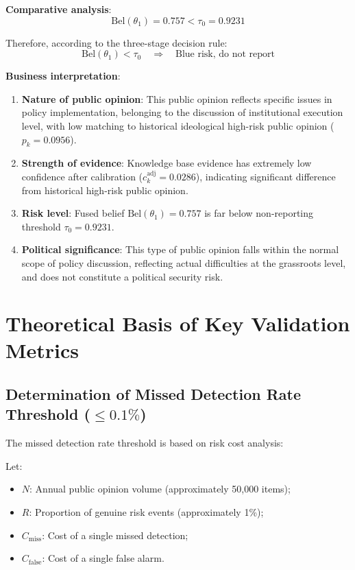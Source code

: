 \documentclass[11pt,a4paper]{report}
\begin{document}
\textbf{Comparative analysis}:
\[
\mathrm{Bel}(\theta_1) = 0.757 < \tau_0 = 0.9231
\]

Therefore, according to the three-stage decision rule:
\[
\mathrm{Bel}(\theta_1) < \tau_0 \quad \Rightarrow \quad \text{Blue risk, do not report}
\]

\textbf{Business interpretation}:
\begin{enumerate}
    \item \textbf{Nature of public opinion}: This public opinion reflects specific issues in policy implementation, belonging to the discussion of institutional execution level, with low matching to historical ideological high-risk public opinion ($p_k = 0.0956$).
    \item \textbf{Strength of evidence}: Knowledge base evidence has extremely low confidence after calibration ($c_k^{\text{adj}} = 0.0286$), indicating significant difference from historical high-risk public opinion.
    \item \textbf{Risk level}: Fused belief $\mathrm{Bel}(\theta_1) = 0.757$ is far below non-reporting threshold $\tau_0 = 0.9231$.
    \item \textbf{Political significance}: This type of public opinion falls within the normal scope of policy discussion, reflecting actual difficulties at the grassroots level, and does not constitute a political security risk.
\end{enumerate}

\section{Theoretical Basis of Key Validation Metrics}

\subsection{Determination of Missed Detection Rate Threshold ($\leq 0.1\%$)}

The missed detection rate threshold is based on risk cost analysis:

Let:
\begin{itemize}
    \item $N$: Annual public opinion volume (approximately 50,000 items);
    \item $R$: Proportion of genuine risk events (approximately 1\%);
    \item $C_{\text{miss}}$: Cost of a single missed detection;
    \item $C_{\text{false}}$: Cost of a single false alarm.
\end{itemize}
\end{document}
